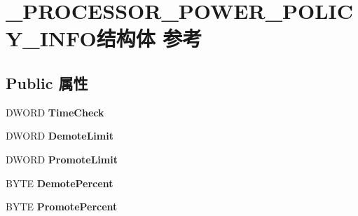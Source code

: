 \hypertarget{struct___p_r_o_c_e_s_s_o_r___p_o_w_e_r___p_o_l_i_c_y___i_n_f_o}{}\section{\+\_\+\+P\+R\+O\+C\+E\+S\+S\+O\+R\+\_\+\+P\+O\+W\+E\+R\+\_\+\+P\+O\+L\+I\+C\+Y\+\_\+\+I\+N\+F\+O结构体 参考}
\label{struct___p_r_o_c_e_s_s_o_r___p_o_w_e_r___p_o_l_i_c_y___i_n_f_o}
\subsection*{Public 属性}
\begin{DoxyCompactItemize}
\item 
\mbox{\label{struct___p_r_o_c_e_s_s_o_r___p_o_w_e_r___p_o_l_i_c_y___i_n_f_o_acbbe09108dcb693a6a9a56aef9ef2d21}} 
D\+W\+O\+RD {\bfseries Time\+Check}
\item 
\mbox{\label{struct___p_r_o_c_e_s_s_o_r___p_o_w_e_r___p_o_l_i_c_y___i_n_f_o_a868ba3df79d8a590a78309c97cc5e4d0}} 
D\+W\+O\+RD {\bfseries Demote\+Limit}
\item 
\mbox{\label{struct___p_r_o_c_e_s_s_o_r___p_o_w_e_r___p_o_l_i_c_y___i_n_f_o_a6372edcc418dd32dc6ff6d7e245ca38c}} 
D\+W\+O\+RD {\bfseries Promote\+Limit}
\item 
\mbox{\label{struct___p_r_o_c_e_s_s_o_r___p_o_w_e_r___p_o_l_i_c_y___i_n_f_o_a624d724d83cfd5bbcc7a6c13b12717c9}} 
B\+Y\+TE {\bfseries Demote\+Percent}
\item 
\mbox{\label{struct___p_r_o_c_e_s_s_o_r___p_o_w_e_r___p_o_l_i_c_y___i_n_f_o_aab0c370aa56e5ad9227558433aa8f044}} 
B\+Y\+TE {\bfseries Promote\+Percent}
\item 
\mbox{\label{struct___p_r_o_c_e_s_s_o_r___p_o_w_e_r___p_o_l_i_c_y___i_n_f_o_a2fac32ae468d661e402ec26436c76c76}} 

\end{DoxyCompactItemize}
